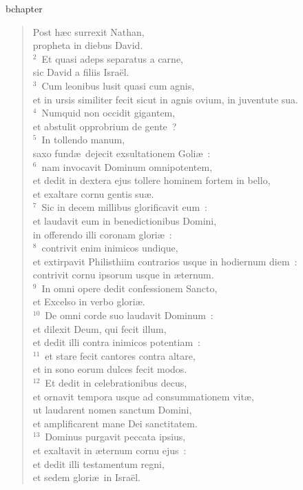 bchapter\begin{verse}\vspace{-19pt}Post h\ae c surrexit Nathan,\\ propheta in diebus David.\\
${}^{2}$~Et quasi adeps separatus a carne,\\ sic David a filiis Isra\"el.\\
${}^{3}$~Cum leonibus lusit quasi cum agnis,\\ et in ursis similiter fecit sicut in agnis ovium, in juventute sua.\\
${}^{4}$~Numquid non occidit gigantem,\\ et abstulit opprobrium de gente~?\\
${}^{5}$~In tollendo manum,\\ saxo fund\ae\ dejecit exsultationem Goli\ae~:\\
${}^{6}$~nam invocavit Dominum omnipotentem,\\ et dedit in dextera ejus tollere hominem fortem in bello,\\ et exaltare cornu gentis su\ae .\\
${}^{7}$~Sic in decem millibus glorificavit eum~:\\ et laudavit eum in benedictionibus Domini,\\ in offerendo illi coronam glori\ae~:\\
${}^{8}$~contrivit enim inimicos undique,\\ et extirpavit Philisthiim contrarios usque in hodiernum diem~:\\ contrivit cornu ipsorum usque in \ae ternum.\\
${}^{9}$~In omni opere dedit confessionem Sancto,\\ et Excelso in verbo glori\ae .\\
${}^{10}$~De omni corde suo laudavit Dominum~:\\ et dilexit Deum, qui fecit illum,\\ et dedit illi contra inimicos potentiam~:\\
${}^{11}$~et stare fecit cantores contra altare,\\ et in sono eorum dulces fecit modos.\\
${}^{12}$~Et dedit in celebrationibus decus,\\ et ornavit tempora usque ad consummationem vit\ae ,\\ ut laudarent nomen sanctum Domini,\\ et amplificarent mane Dei sanctitatem.\\
${}^{13}$~Dominus purgavit peccata ipsius,\\ et exaltavit in \ae ternum cornu ejus~:\\ et dedit illi testamentum regni,\\ et sedem glori\ae\ in Isra\"el.\end{verse}


